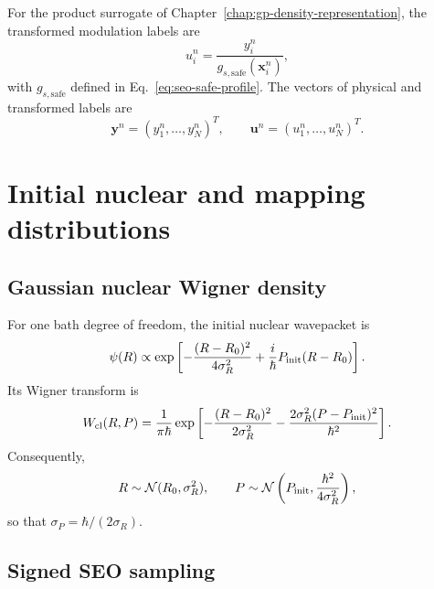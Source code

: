 \documentclass[
  11pt,
  letterpaper,
  onehalfspacing,
  normalmargins,
  equalmargins,
  oneside
]{ut-thesis}
\begin{document}
For the product surrogate of Chapter~\ref{chap:gp-density-representation},
the transformed modulation labels are
\begin{equation}
u_i^n
=
\frac{
y_i^n
}{
g_{s,\mathrm{safe}}(\mathbf x_i^n)
},
\label{appeq:appendix-transformed-label}
\end{equation}
with \(g_{s,\mathrm{safe}}\) defined in
Eq.~\eqref{eq:seo-safe-profile}.  The vectors of physical and transformed
labels are
\[
\mathbf y^n
=
(y_1^n,\ldots,y_N^n)^T,
\qquad
\mathbf u^n
=
(u_1^n,\ldots,u_N^n)^T.
\]

\section{Initial nuclear and mapping distributions}
\label{appsec:initial-distributions}

\subsection{Gaussian nuclear Wigner density}
\label{appsubsec:nuclear-wigner}

For one bath degree of freedom, the initial nuclear wavepacket is
\begin{equation}
\psi(R)
\propto
\exp\left[
-\frac{(R-R_0)^2}{4\sigma_R^2}
+
\frac{i}{\hbar}P_{\rm init}(R-R_0)
\right].
\label{appeq:initial-gaussian-wavepacket}
\end{equation}
Its Wigner transform is
\begin{equation}
W_{\mathrm{cl}}(R,P)
=
\frac{1}{\pi\hbar}
\exp\left[
-\frac{(R-R_0)^2}{2\sigma_R^2}
-
\frac{2\sigma_R^2(P-P_{\rm init})^2}{\hbar^2}
\right].
\label{appeq:initial-nuclear-wigner}
\end{equation}
Consequently,
\begin{equation}
R\sim\mathcal N(R_0,\sigma_R^2),
\qquad
P\sim
\mathcal N
\left(
P_{\rm init},
\frac{\hbar^2}{4\sigma_R^2}
\right),
\label{appeq:nuclear-sampling-law}
\end{equation}
so that \(\sigma_P=\hbar/(2\sigma_R)\).

\subsection{Signed SEO sampling}
\label{appsubsec:signed-seo-sampling}
\end{document}

